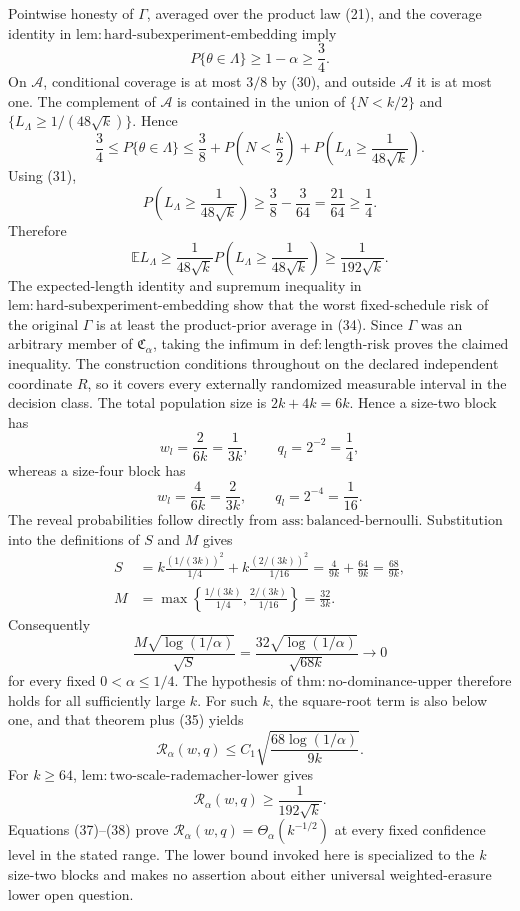 Pointwise honesty of \(\Gamma\), averaged over the product law (21),
and the coverage identity in
\(\mathrm{lem{:}hard\text{-}subexperiment\text{-}embedding}\) imply
\[
 P\{\theta\in\Lambda\}\ge1-\alpha\ge\frac34.
\tag{32}
\]
On \(\mathcal A\), conditional coverage is at most \(3/8\) by (30),
and outside \(\mathcal A\) it is at most one.  The complement of
\(\mathcal A\) is contained in the union of
\(\{N<k/2\}\) and
\(\{L_\Lambda\ge1/(48\sqrt{k})\}\).  Hence
\[
 \frac34
 \le P\{\theta\in\Lambda\}
 \le\frac38+P\left(N<\frac k2\right)
      +P\left(L_\Lambda\ge\frac1{48\sqrt{k}}\right).
\]
Using (31),
\[
 P\left(L_\Lambda\ge\frac1{48\sqrt{k}}\right)
 \ge\frac38-\frac3{64}=\frac{21}{64}\ge\frac14.
\tag{33}
\]
Therefore
\[
 \mathbb E L_\Lambda
 \ge\frac1{48\sqrt{k}}
 P\left(L_\Lambda\ge\frac1{48\sqrt{k}}\right)
 \ge\frac1{192\sqrt{k}}.
\tag{34}
\]
The expected-length identity and supremum inequality in
\(\mathrm{lem{:}hard\text{-}subexperiment\text{-}embedding}\) show
that the worst fixed-schedule risk of the original \(\Gamma\) is at
least the product-prior average in (34).  Since \(\Gamma\) was an
arbitrary member of \(\mathfrak C_\alpha\), taking the infimum in
\(\mathrm{def{:}length\text{-}risk}\) proves the claimed inequality.
The construction conditions throughout on the declared independent
coordinate \(R\), so it covers every externally randomized measurable
interval in the decision class.
The total population size is \(2k+4k=6k\).  Hence a size-two block has
\[
 w_l=\frac2{6k}=\frac1{3k},\qquad q_l=2^{-2}=\frac14,
\]
whereas a size-four block has
\[
 w_l=\frac4{6k}=\frac2{3k},\qquad q_l=2^{-4}=\frac1{16}.
\]
The reveal probabilities follow directly from
\(\mathrm{ass{:}balanced\text{-}bernoulli}\).  Substitution into the
definitions of \(S\) and \(M\) gives
\[
\begin{aligned}
 S
 &=k\frac{(1/(3k))^2}{1/4}
   +k\frac{(2/(3k))^2}{1/16}
   =\frac4{9k}+\frac{64}{9k}
   =\frac{68}{9k},\\
 M
 &=\max\left\{\frac{1/(3k)}{1/4},
                \frac{2/(3k)}{1/16}\right\}
   =\frac{32}{3k}.
\end{aligned}
\tag{35}
\]
Consequently
\[
 \frac{M\sqrt{\log(1/\alpha)}}{\sqrt S}
 =\frac{32\sqrt{\log(1/\alpha)}}{\sqrt{68k}}
 \longrightarrow0
\tag{36}
\]
for every fixed \(0<\alpha\le1/4\).  The hypothesis of
\(\mathrm{thm{:}no\text{-}dominance\text{-}upper}\) therefore holds
for all sufficiently large \(k\).  For such \(k\), the square-root
term is also below one, and that theorem plus (35) yields
\[
 \mathcal R_\alpha(w,q)
 \le C_1\sqrt{\frac{68\log(1/\alpha)}{9k}}.
\tag{37}
\]
For \(k\ge64\),
\(\mathrm{lem{:}two\text{-}scale\text{-}rademacher\text{-}lower}\)
gives
\[
 \mathcal R_\alpha(w,q)\ge\frac1{192\sqrt{k}}.
\tag{38}
\]
Equations (37)--(38) prove
\(\mathcal R_\alpha(w,q)=\Theta_\alpha(k^{-1/2})\) at every fixed
confidence level in the stated range.  The lower bound invoked here is
specialized to the \(k\) size-two blocks and makes no assertion about
either universal weighted-erasure lower open question.

